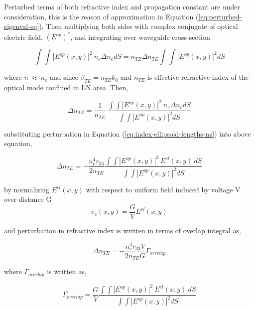\documentclass[thesis]{deutez}
\begin{document}
    Perturbed terms of both refractive index and propagation constant are under consideration, this is the reason of approximation in Equation (\ref{eq:perturbed-eigenval-eq}). Then multiplying both sides with complex conjugate of optical electric field, $(E^{op})^*$, and integrating over waveguide cross-section

    \begin{equation}
        \int \int |E^{op}(x,y)|^2 \: n_e\Delta n_edS = n_{TE}\Delta n_{TE}\int \int |E^{op}(x,y)|^2 dS
        \label{eq:overlap-der1}
    \end{equation}
    
    where $n \: \approx \: n_e$ and since $\beta_{TE} = n_{TE}k_0 $ and $n_{TE}$ is effective refractive index of the optical mode confined in LN area. Then,

    \begin{equation}
        \Delta n_{TE} =\frac{1}{n_{TE}} \: \frac{ \int\int |E^{op}(x,y)|^2 \: n_e\Delta n_edS}{\int\int |E^{op}(x,y)|^2 dS}
        \label{eq:overlap-der2}
    \end{equation}

    substituting perturbation in Equation (\ref{eq:index-ellipsoid-lengths-nz}) into above equation,

    \begin{equation}
        \Delta n_{TE} = -\frac{n_e^4r_{33}}{2n_{TE}}\frac{\int\int |E^{op}(x,y)|^2 \: E^{el}(x,y)\: dS}{\int\int |E^{op}(x,y)|^2 dS}
        \label{eq:overlap-der3}
    \end{equation}

    by normalizing $E^{el}(x,y)$ with respect to uniform field induced by voltage V over distance G $$e_z(x,y) = \frac{G}{V}E^{el}(x,y)$$ 

    and perturbation in refractive index is written in terms of overlap integral as,
    
    \begin{equation}
        \Delta n_{TE} = - \frac{n_e^4r_{33}V}{2n_{TE}G} \Gamma_{overlap}
        \label{eq:overlap-der4}
    \end{equation}

    where $\Gamma_{overlap}$ is written as,

    \begin{equation}
        \Gamma_{overlap} = \frac{G}{V}\frac{\int \int |E^{op}(x,y)|^2 \: E^{el}(x,y)\: dS}{\int\int |E^{op}(x,y)|^2 dS}
        \label{eq:overlap-der-final}
    \end{equation}
\end{document}
